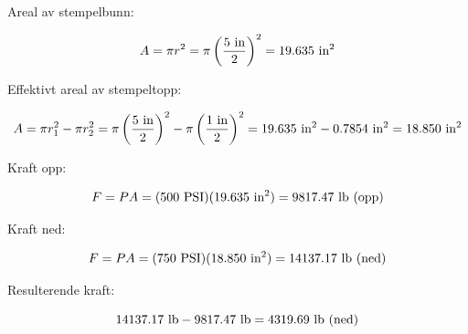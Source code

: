 \vskip 10pt

Areal av stempelbunn:

$$A = \pi r^2 = \pi \left(5 \hbox{ in} \over 2 \right)^2 = 19.635 \hbox{ in}^2$$

Effektivt areal av stempeltopp:

$$A = \pi r_1^2 - \pi r_2^2 = \pi \left(5 \hbox{ in} \over 2 \right)^2 - \pi \left(1 \hbox{ in} \over 2 \right)^2 = 19.635 \hbox{ in}^2 - 0.7854 \hbox{ in}^2 = 18.850 \hbox{ in}^2$$

\vskip 30pt

Kraft opp:

$$F = PA = (500 \hbox{ PSI}) (19.635 \hbox{ in}^2) = 9817.47 \hbox{ lb (opp)}$$

\vskip 10pt

Kraft ned:

$$F = PA = (750 \hbox{ PSI}) (18.850 \hbox{ in}^2) = 14137.17 \hbox{ lb (ned)}$$

\vskip 10pt

Resulterende kraft:

$$14137.17 \hbox{ lb} - 9817.47 \hbox{ lb} = 4319.69 \hbox{ lb (ned)}$$


